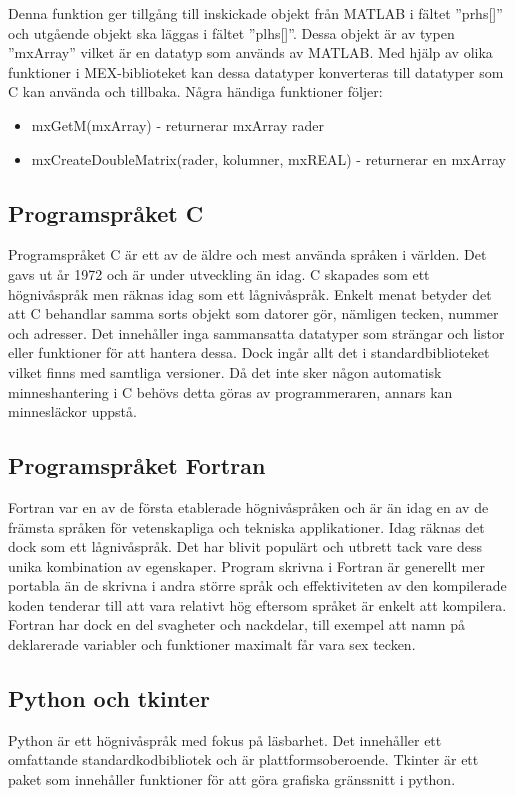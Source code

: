 Denna funktion ger tillgång till inskickade objekt från MATLAB i fältet ''prhs[]'' och utgående objekt ska läggas i fältet ''plhs[]''. Dessa objekt är av typen ''mxArray'' vilket är en datatyp som används av MATLAB. Med hjälp av olika funktioner i MEX-biblioteket kan dessa datatyper konverteras till datatyper som C kan använda och tillbaka\citep{mathworks}. Några händiga funktioner följer:
\begin{itemize}
\item mxGetM(mxArray) - returnerar mxArray rader
\item mxCreateDoubleMatrix(rader, kolumner, mxREAL) - returnerar en mxArray
\end{itemize}

\subsection{Programspråket C}
Programspråket C är ett av de äldre och mest använda språken i världen. Det gavs ut år 1972 och är under utveckling än idag. C skapades som ett högnivåspråk men räknas idag som ett lågnivåspråk. Enkelt menat betyder det att C behandlar samma sorts objekt som datorer gör, nämligen tecken, nummer och adresser. Det innehåller inga sammansatta datatyper som strängar och listor eller funktioner för att hantera dessa. Dock ingår allt det i standardbiblioteket vilket finns med samtliga versioner. Då det inte sker någon automatisk minneshantering i C behövs detta göras av programmeraren, annars kan minnesläckor uppstå. \citep{cbible}

\subsection{Programspråket Fortran}
Fortran var en av de första etablerade högnivåspråken och är än idag en av de främsta språken för vetenskapliga och tekniska applikationer. Idag räknas det dock som ett lågnivåspråk. Det har blivit populärt och utbrett tack vare dess unika kombination av egenskaper. Program skrivna i Fortran är generellt mer portabla än de skrivna i andra större språk och effektiviteten av den kompilerade koden tenderar till att vara relativt hög eftersom språket är enkelt att kompilera. Fortran har dock en del svagheter och nackdelar, till exempel att namn på deklarerade variabler och funktioner maximalt får vara sex tecken. \citep{fortran}     

\subsection{Python och tkinter}
Python är ett högnivåspråk med fokus på läsbarhet. Det innehåller ett omfattande standardkodbibliotek och är plattformsoberoende. \citep{python}  
\newline
\newline
Tkinter är ett paket som innehåller funktioner för att göra grafiska gränssnitt i python. \citep{tkinter}   

